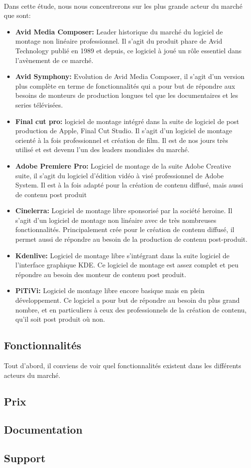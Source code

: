 \paragraph{}
  Dans cette étude, nous nous concentrerons sur les plus grande acteur du marché que sont:
  \begin{itemize}
    \item{\textbf{Avid Media Composer:} Leader historique du marché du logiciel de montage non linéaire
      professionnel. Il s'agit du produit phare de Avid Technology publié en 1989 et depuis, ce
      logiciel à joué un rôle essentiel dans l'avènement de ce marché.}
    \item{\textbf{Avid Symphony:} Evolution de Avid Media Composer, il s'agit d'un version plus complète en terme
      de fonctionnalités qui a pour but de répondre aux besoins de monteurs de production longues tel que
      les documentaires et les series télévisées.}
    \item{\textbf{Final cut pro:} logiciel de montage intégré dans la suite de logiciel de post production
          de Apple, Final Cut Studio. Il s'agit d'un logiciel de montage orienté à la fois
          professionnel et création de film. Il est de nos jours très utilisé et est devenu l'un
          des leaders mondiales du marché.}
    \item{\textbf{Adobe Premiere Pro:} Logiciel de montage de la suite Adobe Creative suite, il s'agit du logiciel
      d'édition vidéo à visé professionnel de Adobe System. Il est à la fois adapté pour la création
      de contenu diffusé, mais aussi de contenu post produit}
    \item{\textbf{Cinelerra:} Logiciel de montage libre sponsorisé par la société heroine. Il s'agit d'un logiciel
      de montage non linéaire avec de très nombreuses fonctionnalités. Principalement crée pour le création de contenu
      diffusé, il permet aussi de répondre au besoin de la production de contenu post-produit.}
    \item{\textbf{Kdenlive:} Logiciel de montage libre s'intégrant dans la suite logiciel de l'interface graphique KDE.
      Ce logiciel de montage est assez complet et peu répondre au besoin des monteur de contenu post produit.}
    \item{\textbf{PiTiVi:} Logiciel de montage libre encore basique mais en plein développement. Ce logiciel a pour
      but de répondre au besoin du plus grand nombre, et en particuliers à ceux des professionnels de la création de
      contenu, qu'il soit post produit où non.}
  \end{itemize}

\subsection{Fonctionnalités}
  Tout d'abord, il conviens de voir quel fonctionnalités existent dans les différents
  acteurs du marché.
  \subsection{Prix}
  \subsection{Documentation}
  \subsection{Support}

